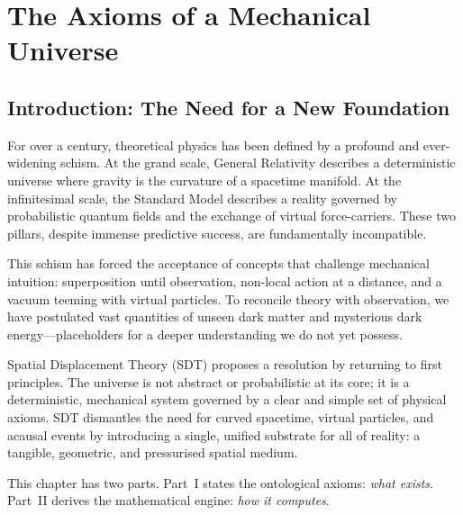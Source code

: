 \chapter{The Axioms of a Mechanical Universe}
\label{ch:axioms}


\section{Introduction: The Need for a New Foundation}

For over a century, theoretical physics has been defined by a profound and ever-widening schism.  At the grand scale, General Relativity describes a deterministic universe where gravity is the curvature of a spacetime manifold.  At the infinitesimal scale, the Standard Model describes a reality governed by probabilistic quantum fields and the exchange of virtual force-carriers.  These two pillars, despite immense predictive success, are fundamentally incompatible.

This schism has forced the acceptance of concepts that challenge mechanical intuition: superposition until observation, non-local action at a distance, and a vacuum teeming with virtual particles.  To reconcile theory with observation, we have postulated vast quantities of unseen dark matter and mysterious dark energy---placeholders for a deeper understanding we do not yet possess.

Spatial Displacement Theory (SDT) proposes a resolution by returning to first principles.  The universe is not abstract or probabilistic at its core; it is a deterministic, mechanical system governed by a clear and simple set of physical axioms.  SDT dismantles the need for curved spacetime, virtual particles, and acausal events by introducing a single, unified substrate for all of reality: a tangible, geometric, and pressurised spatial medium.

This chapter has two parts.  Part~I states the ontological axioms: \emph{what exists}.  Part~II derives the mathematical engine: \emph{how it computes}.


